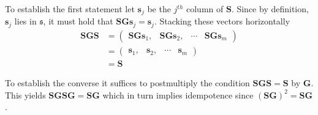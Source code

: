\documentclass[12pt]{article}
\theoremstyle{definition}
\theoremstyle{property}
\begin{document}
	To establish the first statement let $\bm{s}_j$ be the $j^{th}$ column of $\bm{S}$.  Since by definition, $\bm{s}_j$ lies in $\mathfrak{s}$, it must hold that $\bm{S}\bm{G}\bm{s}_j=\bm{s}_j$.  Stacking these vectors horizontally
	\begin{align}
	\bm{S}\bm{G}\bm{S}&=\begin{pmatrix}
	\bm{S}\bm{G}\bm{s}_1, & \bm{S}\bm{G}\bm{s}_2, & \cdots & \bm{S}\bm{G}\bm{s}_m
	\end{pmatrix}\\
	&=\begin{pmatrix}
	\bm{s}_1, & \bm{s}_2, & \cdots & \bm{s}_m
	\end{pmatrix}\\
	&=\bm{S}
	\end{align}
	
	To establish the converse it suffices to postmultiply the condition $\bm{S}\bm{G}\bm{S}=\bm{S}$ by $\bm{G}$.  This yields $\bm{S}\bm{G}\bm{S}\bm{G}=\bm{S}\bm{G}$ which in turn implies idempotence since $(\bm{S}\bm{G})^2=\bm{S}\bm{G}$.
	
	\newpage
	

	
	
	
	
	
\end{document}
